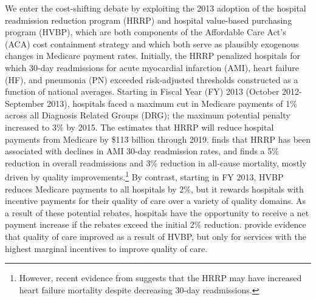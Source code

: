 \documentclass[12pt]{article}
\begin{document}
We enter the cost-shifting debate by exploiting the 2013 adoption of the hospital readmission reduction program (HRRP) and hospital value-based purchasing program (HVBP), which are both components of the Affordable Care Act's (ACA) cost containment strategy and which both serve as plausibly exogenous changes in Medicare payment rates.  Initially, the HRRP penalized hospitals for which 30-day readmissions for acute myocardial infarction (AMI), heart failure (HF), and pneumonia (PN) exceeded risk-adjusted thresholds constructed as a function of national averages.  Starting in Fiscal Year (FY) 2013 (October 2012-September 2013), hospitals faced a maximum cut in Medicare payments of 1\% across all Diagnosis Related Groups (DRG); the maximum potential penalty increased to 3$\%$ by 2015.  The \cite{cbo2010} estimates that HRRP will reduce hospital payments from Medicare by \$113 billion through 2019.  \citet{mellor2016} finds that HRRP has been associated with declines in AMI 30-day readmission rates, and \citet{gupta2016} finds a 5\% reduction in overall readmissions and 3\% reduction in all-cause mortality, mostly driven by quality improvements.\footnote{However, recent evidence from \citet{gupta2017} suggests that the HRRP may have increased heart failure mortality despite decreasing 30-day readmissions.}  By contrast, starting in FY 2013, HVBP reduces Medicare payments to all hospitals by 2\%, but it rewards hospitals with incentive payments for their quality of care over a variety of quality domains. As a result of these potential rebates, hospitals have the opportunity to receive a net payment increase if the rebates exceed the initial 2$\%$ reduction.  \citet{norton2016} provide evidence that quality of care improved as a result of HVBP, but only for services with the highest marginal incentives to improve quality of care.
\end{document}
